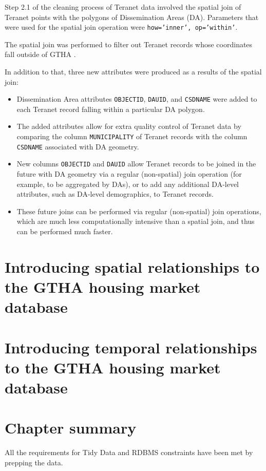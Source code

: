 Step 2.1 of the cleaning process of Teranet data involved the spatial join of Teranet points with the polygons of Dissemination Areas (DA).
Parameters that were used for the spatial join operation were \texttt{how='inner', op='within'}.

The spatial join was performed to filter out Teranet records whose coordinates fall outside of GTHA .

In addition to that, three new attributes were produced as a results of the spatial join:
\begin{itemize}
    \item Dissemination Area attributes \texttt{OBJECTID}, \texttt{DAUID}, and \texttt{CSDNAME} were added to each Teranet record falling within a particular DA polygon.
    \item The added attributes allow for extra quality control of Teranet data by comparing the column \texttt{MUNICIPALITY} of Teranet records with the column \texttt{CSDNAME} associated with DA geometry.
    \item New columns \texttt{OBJECTID} and \texttt{DAUID} allow Teranet records to be joined in the future with DA geometry via a regular (non-spatial) join operation (for example, to be aggregated by DAs), or to add any additional DA-level attributes, such as DA-level demographics, to Teranet records.
    \item These future joins can be performed via regular (non-spatial) join operations, which are much less computationally intensive than a spatial join, and thus can be performed much faster.
\end{itemize}

\section{Introducing spatial relationships to the GTHA housing market database} \label{sec:introducing_spatial_relationships}

\section{Introducing temporal relationships to the GTHA housing market database} \label{sec:introducing_temporal_relationships}

\section{Chapter summary} \label{sec:data_preparation_summary}
All the requirements for Tidy Data and RDBMS constraints have been met by prepping the data.
